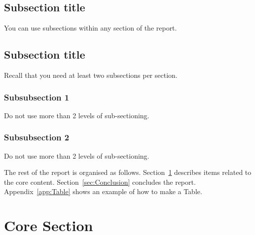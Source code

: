 \documentclass{UoNMCHA}
\numberwithin{equation}{section}
\begin{document}
\subsection{Subsection title}
You can use subsections within any section of the report. 
\subsection{Subsection title}
Recall that you need at least two subsections per section.
\subsubsection{Subsubsection 1}
Do not use more than 2 levels of sub-sectioning.
\subsubsection{Subsubsection 2}
Do not use more than 2 levels of sub-sectioning.

The rest of the report is organised as follows. Section~\ref{sec:Core Section} describes items related to the core content. Section~\ref{sec:Conclusion} concludes the report. Appendix~\ref{app:Table} shows an example of how to make a Table.
\section{Core Section}\label{sec:Core Section}
\end{document}
